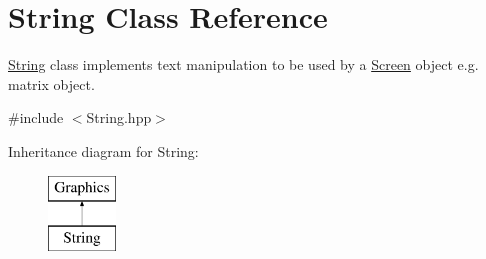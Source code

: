 \hypertarget{class_string}{}\section{String Class Reference}
\label{class_string}


\hyperlink{class_string}{String} class implements text manipulation to be used by a \hyperlink{class_screen}{Screen} object e.\+g. matrix object.  




{\ttfamily \#include $<$String.\+hpp$>$}

Inheritance diagram for String\+:\begin{figure}[H]
\begin{center}
\leavevmode
\includegraphics[height=2.000000cm]{class_string}
\end{center}
\end{figure}

